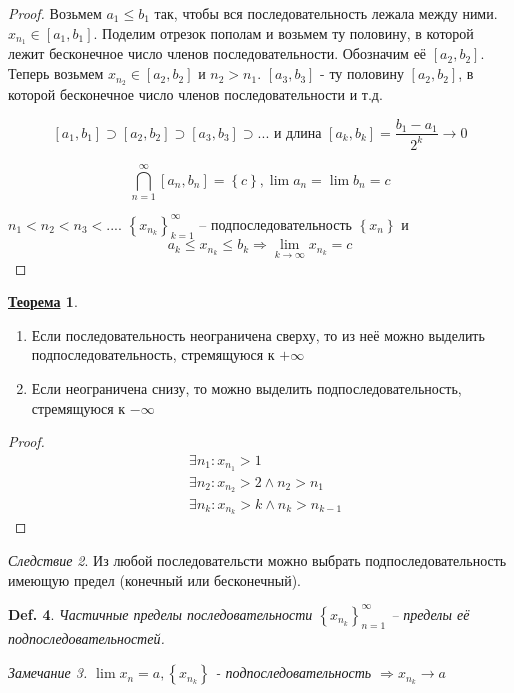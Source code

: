 \documentclass[12pt]{article}
\newenvironment{MyList}[1][4pt]{
  \begin{enumerate}[1.]
  \setlength{\parskip}{0pt}
  \setlength{\itemsep}{#1}
}{       
  \end{enumerate}
}
\def\SO{\Rightarrow}     %
\def\Pagebreak{\pagebreak\vspace*{-1.5em}}
\theoremstyle{definition} %
\newtheorem{Thm}{\underline{Теорема}}[subsection] %
\theoremstyle{plain} %
\newtheorem{Def}[Thm]{Def.} %
\theoremstyle{remark} %
\newtheorem{Cons}[Thm]{Следствие} %
\newtheorem{Rem}[Thm]{Замечание} %
\begin{document}
\begin{proof}
    Возьмем $a_1 \leqslant b_1$ так, чтобы вся последовательность лежала между ними. 
    $x_{n_1} \in [a_1, b_1]$. Поделим отрезок пополам и возьмем ту половину, в которой лежит бесконечное число членов последовательности. Обозначим её $[a_2, b_2]$. 
    Теперь возьмем $x_{n_2} \in [a_2, b_2]$ и $n_2 > n_1$. $[a_3, b_3]$ - ту половину $[a_2, b_2]$, в которой бесконечное число членов последовательности и т.д.
    
    \[[a_1, b_1] \supset [a_2, b_2] \supset [a_3, b_3] \supset ... \text{ и длина } [a_k, b_k] = \frac{b_1 - a_1}{2^k} \to 0\]

    \[\bigcap_{n = 1}^\infty [a_n, b_n] = \left\{c\right\}, \lim a_n = \lim b_n = c\]

    $n_1 < n_2 < n_3 < ...$. $\left\{x_{n_k}\right\}_{k = 1}^{\infty}$ -- подпоследовательность $\left\{x_n\right\}$ и $$a_k \leqslant x_{n_k} \leqslant b_k \SO \lim_{k \to \infty} x_{n_k} = c$$    
\end{proof}

\begin{Thm}
    \begin{MyList}
        \item Если последовательность неограничена сверху, то из неё можно выделить подпоследовательность, стремящуюся к $+\infty$ 
        \item Если неограничена снизу, то можно выделить подпоследовательность, стремящуюся к $-\infty$ 
    \end{MyList}
\end{Thm}

\begin{proof}
    \begin{align*}
        &\exists n_1 : x_{n_1} > 1 \\
        &\exists n_2 : x_{n_2} > 2 \wedge n_2 > n_1 \\
        &\exists n_k : x_{n_k} > k \wedge n_k > n_{k - 1}
    \end{align*} 
\end{proof}

\Pagebreak
\begin{Cons}
    Из любой последовательсти можно выбрать подпоследовательность имеющую предел (конечный или бесконечный).
\end{Cons}

\begin{Def}
    Частичные пределы последовательности $\left\{x_{n_k}\right\}_{n = 1}^\infty$ -- пределы её подпоследовательностей.
    
    \begin{Rem}
        $\lim x_n = a, \left\{x_{n_k}\right\}$ - подпоследовательность $\SO x_{n_k} \to a$ 
    \end{Rem}
\end{Def}
\end{document}
